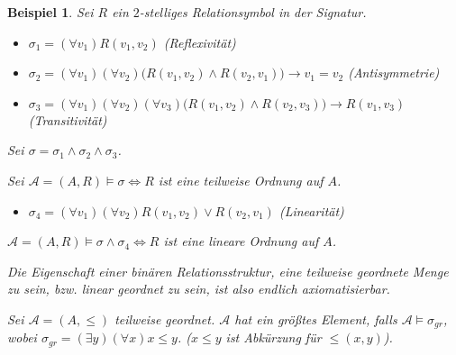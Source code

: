 \documentclass{article}
\theoremstyle{definition}
\theoremstyle{plain}
\newtheorem*{bsp}{Beispiel}
\newcommand{\m}[1]{\mathcal{#1}}
\begin{document}
    \begin{bsp}
        Sei $ R $ ein $ 2 $-stelliges Relationsymbol in der Signatur.
        \begin{itemize}
            \item $ \sigma_1 = (\forall v_1) R(v_1, v_2) $ \hfill \textit{(Reflexivität)}
            \item $ \sigma_2 = (\forall v_1) (\forall v_2) \big(R(v_1, v_2) \land R(v_2, v_1)\big) \rightarrow v_1 = v_2 $ \hfill \textit{(Antisymmetrie)}
            \item $ \sigma_3 = (\forall v_1) (\forall v_2) (\forall v_3) \big(R(v_1, v_2) \land R(v_2, v_3)\big) \rightarrow R(v_1, v_3) $ \hfill \textit{(Transitivität)}
        \end{itemize}

        Sei $ \sigma = \sigma_1 \land \sigma_2 \land \sigma_3 $.

        Sei $ \m{A} = (A, R) \models \sigma \Leftrightarrow R $  ist eine teilweise Ordnung auf $ A $.

        \begin{itemize}
            \item $ \sigma_4 = (\forall v_1) (\forall v_2) R(v_1, v_2) \lor R(v_2, v_1) $ \hfill \textit{(Linearität)}
        \end{itemize}

        $ \m{A} = (A, R) \models \sigma \land \sigma_4 \Leftrightarrow R $ ist eine lineare Ordnung auf $ A $.

        Die Eigenschaft einer binären Relationsstruktur, eine teilweise geordnete Menge zu sein, bzw. linear geordnet zu sein, ist also endlich axiomatisierbar.

        Sei $ \m{A} = (A, \leq) $ teilweise geordnet.
        $ \m{A} $ hat ein größtes Element, falls $ \m{A} \models \sigma_{gr} $, wobei $ \sigma_{gr} = (\exists y) (\forall x) x \leq y $. \textit{($ x \leq y $ ist Abkürzung für $ \leq(x, y) $)}.
    \end{bsp}
\end{document}
